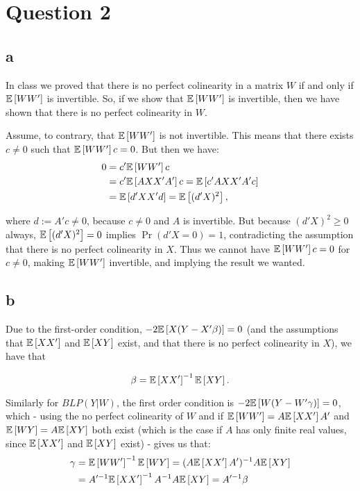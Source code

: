 \documentclass[12pt]{paper}
\begin{document}

\section*{Question 2}

\subsection*{a}

In class we proved that there is no perfect colinearity in a matrix $W$ if and only if $\mathbb{E} \left [ WW' \right ]$ is invertible. So, if we show that $\mathbb{E} \left [ WW' \right ]$ is invertible, then we have shown that there is no perfect colinearity in $W$.

Assume, to contrary, that $\mathbb{E} \left [ WW' \right ]$ is not invertible. This means that there exists $c\ne0$ such that $\mathbb{E} \left [ WW' \right ]c=0$. But then we have:
\begin{equation}
\begin{split}
0&=c'\mathbb{E} \left [ WW' \right ]c\\
&=c'\mathbb{E} \left [ AXX'A' \right ]c=\mathbb{E} \left [ c'AXX'A'c \right ]\\
&=\mathbb{E} \left [ d'XX'd \right ]=\mathbb{E} \left [ (d'X)^2 \right ],
\end{split}
\end{equation}

\noindent where $d:=A'c\ne0$, because $c\ne0$ and $A$ is invertible. But because $(d'X)^2\ge 0$ always, $\mathbb{E} \left [ (d'X)^2 \right ]=0$ implies $\Pr(d'X=0)=1$, contradicting the assumption that there is no perfect colinearity in $X$. Thus we cannot have $\mathbb{E} \left [ WW' \right ]c=0$ for $c\ne0$, making $\mathbb{E} \left [ WW' \right ]$ invertible, and implying the result we wanted.

\subsection*{b}

Due to the first-order condition, $-2\mathbb{E} \left [ X(Y-X'\beta) \right ]=0$ (and the assumptions that $\mathbb{E} \left [ XX' \right ]$ and $\mathbb{E} \left [ XY \right ]$ exist, and that there is no perfect colinearity in $X$), we have that 

\begin{equation}
\beta=\mathbb{E} \left [ XX' \right ]^{-1}\mathbb{E} \left [ XY \right ].
\end{equation}

Similarly for $BLP(Y|W)$, the first order condition is $-2\mathbb{E} \left [ W(Y-W'\gamma) \right ]=0$, which - using the no perfect colinearity of $W$ and if $\mathbb{E} \left [ WW' \right ]=A\mathbb{E} \left [ XX' \right ]A'$ and $\mathbb{E} \left [ WY \right ]=A\mathbb{E} \left [ XY \right ]$ both exist (which is the case if $A$ has only finite real values, since $\mathbb{E} \left [ XX' \right ]$ and $\mathbb{E} \left [ XY \right ]$ exist) -  gives us that:
\begin{equation}
\begin{split}
\gamma&=\mathbb{E} \left [ WW' \right ]^{-1}\mathbb{E} \left [ WY \right ]=(A\mathbb{E} \left [ XX' \right ]A')^{-1}A\mathbb{E} \left [ XY \right ]\\
&=A'^{-1}\mathbb{E} \left [ XX' \right ]^{-1}A^{-1}A\mathbb{E} \left [ XY \right ]=A'^{-1}\beta
\end{split}
\end{equation}
\end{document}
